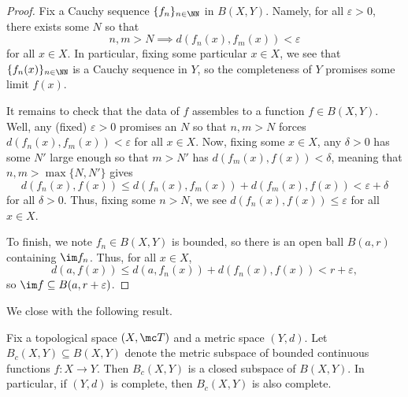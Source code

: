 \documentclass[../notes.tex]{subfiles}
\begin{document}
\begin{proof}
	Fix a Cauchy sequence $\{f_n\}_{n\in\NN}$ in $B(X,Y)$. Namely, for all $\varepsilon>0$, there exists some $N$ so that
	\[n,m>N\implies d(f_n(x),f_m(x))<\varepsilon\]
	for all $x\in X$. In particular, fixing some particular $x\in X$, we see that $\{f_n(x)\}_{n\in\NN}$ is a Cauchy sequence in $Y$, so the completeness of $Y$ promises some limit $f(x)$.

	It remains to check that the data of $f$ assembles to a function $f\in B(X,Y)$. Well, any (fixed) $\varepsilon>0$ promises an $N$ so that $n,m>N$ forces $d(f_n(x),f_m(x))<\varepsilon$ for all $x\in X$. Now, fixing some $x\in X$, any $\delta>0$ has some $N'$ large enough so that $m>N'$ has $d(f_m(x),f(x))<\delta$, meaning that $n,m>\max\{N,N'\}$ gives
	\[d(f_n(x),f(x))\le d(f_n(x),f_m(x))+d(f_m(x),f(x))<\varepsilon+\delta\]
	for all $\delta>0$. Thus, fixing some $n>N$, we see $d(f_n(x),f(x))\le\varepsilon$ for all $x\in X$.

	To finish, we note $f_n\in B(X,Y)$ is bounded, so there is an open ball $B(a,r)$ containing $\im f_n$. Thus, for all $x\in X$,
	\[d(a,f(x))\le d(a,f_n(x))+d(f_n(x),f(x))<r+\varepsilon,\]
	so $\im f\subseteq B(a,r+\varepsilon)$.
\end{proof}
We close with the following result.
\begin{proposition} \label{prop:contiscomplete}
	Fix a topological space $(X,\mc T)$ and a metric space $(Y,d)$. Let $B_c(X,Y)\subseteq B(X,Y)$ denote the metric subspace of bounded continuous functions $f\colon X\to Y$. Then $B_c(X,Y)$ is a closed subspace of $B(X,Y)$. In particular, if $(Y,d)$ is complete, then $B_c(X,Y)$ is also complete.
\end{proposition}
\end{document}
